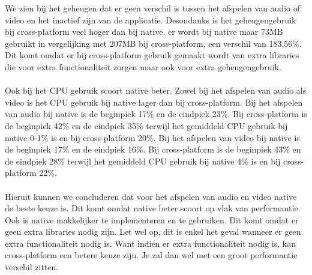 We zien bij het geheugen dat er geen verschil is tussen het afspelen van audio of video 
en het inactief zijn van de applicatie. Desondanks is het geheugengebruik bij cross-platform veel 
hoger dan bij native. er wordt bij native maar 73MB gebruikt in vergelijking met 207MB 
bij cross-platform, een verschil van 183,56\%. 
Dit komt omdat er bij cross-platform gebruik gemaakt wordt van extra libraries die voor 
extra functionaliteit zorgen maar ook voor extra geheugengebruik.
\\\\
Ook bij het CPU gebruik scoort native beter. Zowel bij het afspelen van audio als video 
is het CPU gebruik bij native lager dan bij cross-platform. Bij het afspelen van audio bij 
native is de beginpiek 17\% en de eindpiek 23\%. Bij cross-platform is de 
beginpiek 42\% en de eindpiek 35\% terwijl het gemiddeld CPU gebruik bij native 0-1\% is en bij
cross-platform 20\%. Bij het afspelen van video bij native is de beginpiek 17\% en de eindpiek 16\%.
Bij cross-platform is de beginpiek 43\% en de eindpiek 28\% terwijl het gemiddeld CPU gebruik bij
native 4\% is en bij cross-platform 22\%. 
\\\\
Hieruit kunnen we concluderen dat voor het afspelen van audio en video native de beste keuze is.
Dit komt omdat native beter scoort op vlak van performantie. Ook is native makkelijker te implementeren
en te gebruiken. Dit komt omdat er geen extra libraries nodig zijn. Let wel op, dit is enkel het geval
wanneer er geen extra functionaliteit nodig is. Want indien er extra functionaliteit nodig is, kan
cross-platform een betere keuze zijn. Je zal dan wel met een groot performantie verschil zitten.
















